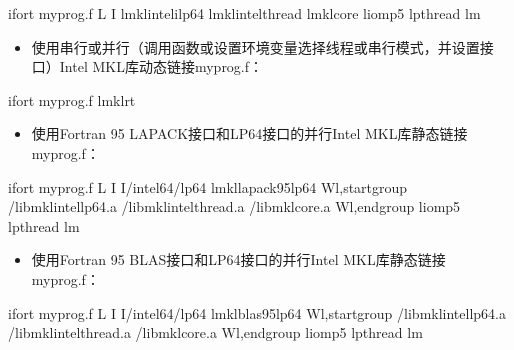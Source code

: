 \documentclass[a4paper,12pt,english]{sphinxmanual}
\begin{document}
\begin{sphinxVerbatim}[commandchars=\\\{\}]
ifort myprog.f \PYGZhy{}L \PYGZhy{}I 
\PYGZhy{}lmkl\PYGZus{}intel\PYGZus{}ilp64 \PYGZhy{}lmkl\PYGZus{}intel\PYGZus{}thread \PYGZhy{}lmkl\PYGZus{}core \PYGZhy{}liomp5 \PYGZhy{}lpthread \PYGZhy{}lm
\end{sphinxVerbatim}
\begin{itemize}
\item {} 
\sphinxAtStartPar
使用串行或并行（调用函数或设置环境变量选择线程或串行模式，并设置接口）Intel MKL库动态链接myprog.f：

\end{itemize}

\begin{sphinxVerbatim}[commandchars=\\\{\}]
ifort myprog.f \PYGZhy{}lmkl\PYGZus{}rt
\end{sphinxVerbatim}
\begin{itemize}
\item {} 
\sphinxAtStartPar
使用Fortran 95 LAPACK接口和LP64接口的并行Intel MKL库静态链接myprog.f：

\end{itemize}

\begin{sphinxVerbatim}[commandchars=\\\{\}]
ifort myprog.f \PYGZhy{}L \PYGZhy{}I \PYGZhy{}I/intel64/lp64 
\PYGZhy{}lmkl\PYGZus{}lapack95\PYGZus{}lp64 \PYGZhy{}Wl,\PYGZhy{}\PYGZhy{}start\PYGZhy{}group /libmkl\PYGZus{}intel\PYGZus{}lp64.a 
/libmkl\PYGZus{}intel\PYGZus{}thread.a /libmkl\PYGZus{}core.a 
\PYGZhy{}Wl,\PYGZhy{}\PYGZhy{}end\PYGZhy{}group \PYGZhy{}liomp5 \PYGZhy{}lpthread \PYGZhy{}lm
\end{sphinxVerbatim}
\begin{itemize}
\item {} 
\sphinxAtStartPar
使用Fortran 95 BLAS接口和LP64接口的并行Intel MKL库静态链接myprog.f：

\end{itemize}

\begin{sphinxVerbatim}[commandchars=\\\{\}]
ifort myprog.f \PYGZhy{}L \PYGZhy{}I \PYGZhy{}I/intel64/lp64 
\PYGZhy{}lmkl\PYGZus{}blas95\PYGZus{}lp64 \PYGZhy{}Wl,\PYGZhy{}\PYGZhy{}start\PYGZhy{}group /libmkl\PYGZus{}intel\PYGZus{}lp64.a 
/libmkl\PYGZus{}intel\PYGZus{}thread.a /libmkl\PYGZus{}core.a 
\PYGZhy{}Wl,\PYGZhy{}\PYGZhy{}end\PYGZhy{}group \PYGZhy{}liomp5 \PYGZhy{}lpthread \PYGZhy{}lm
\end{sphinxVerbatim}
\end{document}
